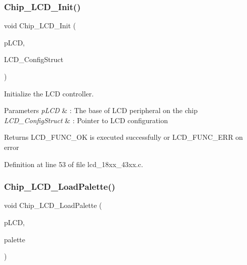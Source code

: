 \subsubsection{\texorpdfstring{Chip\+\_\+\+L\+C\+D\+\_\+\+Init()}{Chip\_LCD\_Init()}}
{\footnotesize\ttfamily void Chip\+\_\+\+L\+C\+D\+\_\+\+Init (\begin{DoxyParamCaption}\item[{\hyperlink{struct_l_p_c___l_c_d___t}{L\+P\+C\+\_\+\+L\+C\+D\+\_\+T} $\ast$}]{p\+L\+CD,  }\item[{\hyperlink{struct_l_c_d___c_o_n_f_i_g___t}{L\+C\+D\+\_\+\+C\+O\+N\+F\+I\+G\+\_\+T} $\ast$}]{L\+C\+D\+\_\+\+Config\+Struct }\end{DoxyParamCaption})}



Initialize the L\+CD controller. 


\begin{DoxyParams}{Parameters}
{\em p\+L\+CD} & \+: The base of L\+CD peripheral on the chip \\
\hline
{\em L\+C\+D\+\_\+\+Config\+Struct} & \+: Pointer to L\+CD configuration \\
\hline
\end{DoxyParams}
\begin{DoxyReturn}{Returns}
L\+C\+D\+\_\+\+F\+U\+N\+C\+\_\+\+OK is executed successfully or L\+C\+D\+\_\+\+F\+U\+N\+C\+\_\+\+E\+RR on error 
\end{DoxyReturn}


Definition at line 53 of file lcd\+\_\+18xx\+\_\+43xx.\+c.

\mbox{\label{group___l_c_d__18_x_x__43_x_x_gaca363a0ae6e47d7bba4d0c51b99b0c8a}} 
\subsubsection{\texorpdfstring{Chip\+\_\+\+L\+C\+D\+\_\+\+Load\+Palette()}{Chip\_LCD\_LoadPalette()}}
{\footnotesize\ttfamily void Chip\+\_\+\+L\+C\+D\+\_\+\+Load\+Palette (\begin{DoxyParamCaption}\item[{\hyperlink{struct_l_p_c___l_c_d___t}{L\+P\+C\+\_\+\+L\+C\+D\+\_\+T} $\ast$}]{p\+L\+CD,  }\item[{void $\ast$}]{palette }\end{DoxyParamCaption})}



